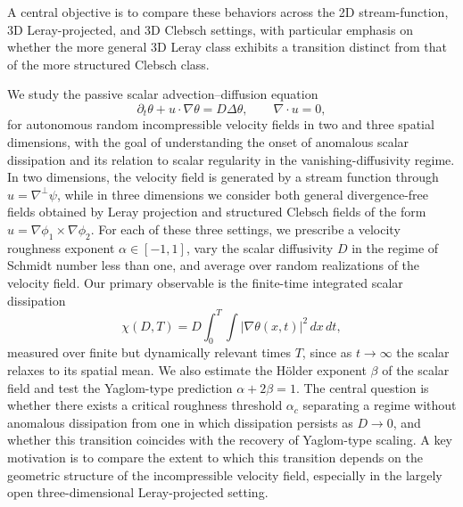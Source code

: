 \begin{problem}
A central objective is to compare these behaviors across the 2D stream-function, 3D Leray-projected, and 3D Clebsch settings, with particular emphasis on whether the more general 3D Leray class exhibits a transition distinct from that of the more structured Clebsch class.
\end{problem}



We study the passive scalar advection--diffusion equation
\begin{equation}
\partial_t \theta + u\cdot \nabla \theta = D \Delta \theta,
\qquad \nabla\cdot u = 0,
\end{equation}
for autonomous random incompressible velocity fields in two and three spatial dimensions, with the goal of understanding the onset of anomalous scalar dissipation and its relation to scalar regularity in the vanishing-diffusivity regime. In two dimensions, the velocity field is generated by a stream function through $u=\nabla^\perp \psi$, while in three dimensions we consider both general divergence-free fields obtained by Leray projection and structured Clebsch fields of the form $u=\nabla \phi_1\times \nabla \phi_2$. For each of these three settings, we prescribe a velocity roughness exponent $\alpha\in[-1,1]$, vary the scalar diffusivity $D$ in the regime of Schmidt number less than one, and average over random realizations of the velocity field. Our primary observable is the finite-time integrated scalar dissipation
\begin{equation}
\chi(D,T)=D\int_0^T\int |\nabla \theta(x,t)|^2\,dx\,dt,
\end{equation}
measured over finite but dynamically relevant times $T$, since as $t\to\infty$ the scalar relaxes to its spatial mean. We also estimate the H\"older exponent $\beta$ of the scalar field and test the Yaglom-type prediction $\alpha+2\beta=1$. The central question is whether there exists a critical roughness threshold $\alpha_c$ separating a regime without anomalous dissipation from one in which dissipation persists as $D\to 0$, and whether this transition coincides with the recovery of Yaglom-type scaling. A key motivation is to compare the extent to which this transition depends on the geometric structure of the incompressible velocity field, especially in the largely open three-dimensional Leray-projected setting.




